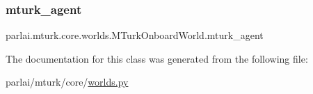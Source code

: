 \subsubsection{\texorpdfstring{mturk\+\_\+agent}{mturk\_agent}}
{\footnotesize\ttfamily parlai.\+mturk.\+core.\+worlds.\+M\+Turk\+Onboard\+World.\+mturk\+\_\+agent}



The documentation for this class was generated from the following file\+:\begin{DoxyCompactItemize}
\item 
parlai/mturk/core/\hyperlink{parlai_2mturk_2core_2worlds_8py}{worlds.\+py}\end{DoxyCompactItemize}
